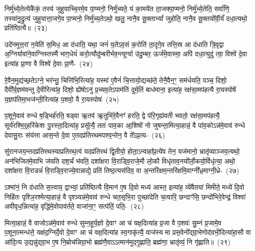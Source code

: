 निर्मु॑च्ये॒तेत्येकै॑कं॒ तस्य॑ जुहुयाच्चि॒रमे॒व पा॒प्मनो॒ निर्मु॑च्यते॒ यं का॒मये॑त ता॒जक्पा॒प्मनो॒ निर्मु॑च्ये॒तेति॒ सर्वा॑णि॒ तस्या॑नु॒द्रुत्य॑ जुहुयात्ता॒जगे॒व पा॒प्मनो॒ निर्मु॑च्य॒ते\-ऽथो॒ खलु॒ नानै॒व सू॒क्ता\-भ्यां᳚ जुहोति॒ नानै॒व सू॒क्तयो᳚र्वी॒र्यं॑ दधा॒त्यथो॒ प्रति॑ष्ठित्यै॥~(२३)\ip

{\anuvakamend[{दे॒वाः प्रा॑जाप॒त्यो वृ॒त्रश्चि॒रं पा॒प्मन॑श्चत्वारि॒ꣳ॒शच्च॑}]}

उदे॑नमुत्त॒रां न॒येति॑ स॒मिध॒ आ द॑धाति॒ यथा॒ जनं॑ य॒ते॑\-ऽव॒सं क॒रोति॑ ता॒दृगे॒व तत्ति॒स्र आ द॑धाति त्रि॒वृद्वा अ॒ग्निर्यावा॑ने॒वाग्निस्तस्मै॑ भाग॒\-धेयं॑ करो॒त्यौदु॑म्बरीर्भव॒न्त्यूर्ग्वा उ॑दु॒म्बर॒ ऊर्ज॑मे॒वास्मा॒ अपि॑ दधा॒त्युदु॑ त्वा॒ विश्वे॑ दे॒वा इत्या॑ह प्रा॒णा वै विश्वे॑ दे॒वाः प्रा॒णै-~(२४)\ip

रे॒वैन॒मुद्य॑च्छ॒ते\-ऽग्ने॒ भर॑न्तु॒ चित्ति॑भि॒रित्या॑ह॒ यस्मा॑ ए॒वैनं॑ चि॒त्तायो॒द्यच्छ॑ते॒ तेनै॒वैन॒ꣳ॒ सम॑र्धयति॒ पञ्च॒ दिशो॒ दैवी᳚र्य॒ज्ञम॑वन्तु दे॒वीरित्या॑ह॒ दिशो॒ ह्ये॑षो\-ऽनु॑ प्र॒च्यव॒ते\-ऽपाम॑तिं दुर्म॒तिं बाध॑माना॒ इत्या॑ह॒ रक्ष॑सा॒मप॑हत्यै रा॒यस्पोषे॑ य॒ज्ञप॑तिमा॒भज॑न्ती॒रित्या॑ह प॒शवो॒ वै रा॒यस्पोषः॑~(२५)\ip

प॒शूने॒वाव॑ रुन्धे ष॒ड्भिर्\mbox{}ह॑रति॒ षड्वा ऋ॒तव॑ ऋ॒तुभि॑रे॒वैनꣳ॑ हरति॒ द्वे प॑रि॒गृह्य॑वती भवतो॒ रक्ष॑सा॒मप॑हत्यै॒ सूर्य॑रश्मि॒र्॒\mbox{}हरि॑केशः पु॒रस्ता॒दित्या॑ह॒ प्रसू᳚त्यै॒ ततः॑ पाव॒का आ॒शिषो॑ नो जुषन्ता॒मित्या॒हान्नं॒ वै पा॑व॒को\-ऽन्न॑मे॒वाव॑ रुन्धे देवासु॒राः संय॑त्ता आस॒न्ते दे॒वा ए॒तदप्र॑तिरथमपश्य॒न्तेन॒ वै ते᳚\-ऽप्र॒त्य-~(२६)\ip

सु॑रानजय॒न्तदप्र॑तिरथस्याप्रतिरथ॒त्वं यदप्र॑तिरथं द्वि॒तीयो॒ होता॒\-ऽन्वाहा᳚प्र॒त्ये॑व तेन॒ यज॑मानो॒ भ्रातृ॑व्याञ्जय॒त्यथो॒ अन॑भिजितमे॒वाभि ज॑यति दश॒र्चं भ॑वति॒ दशा᳚क्षरा वि॒राड्वि॒राजे॒मौ लो॒कौ विधृ॑ताव॒नयो᳚र्लो॒कयो॒र्विधृ॑त्या॒ अथो॒ दशा᳚क्षरा वि॒राडन्नं॑ वि॒राड्वि॒राज्ये॒वान्नाद्ये॒ प्रति॑ तिष्ठ॒त्यस॑दिव॒ वा अ॒न्तरि॑क्षम॒न्तरि॑क्षमि॒वाग्नी᳚ध्र॒माग्नी॒ध्रे-~(२७)\ip

ऽश्मा॑नं॒ नि द॑धाति स॒त्त्वाय॒ द्वाभ्यां॒ प्रति॑ष्ठित्यै वि॒मान॑ ए॒ष दि॒वो मध्य॑ आस्त॒ इत्या॑ह॒ व्ये॑वैतया॑ मिमीते॒ मध्ये॑ दि॒वो निहि॑तः पृश्ञि॒रश्मेत्या॒हान्नं॒ वै पृश्ञ्यन्न॑मे॒वाव॑ रुन्धे चत॒सृभि॒रा पुच्छा॑देति च॒त्वारि॒ छन्दाꣳ॑सि॒ छन्दो॑भिरे॒वेन्द्रं॒ विश्वा॑ अवीवृध॒न्नित्या॑ह॒ वृद्धि॑मे॒वोपाव॑र्तते॒ वाजा॑ना॒ꣳ॒ सत्प॑तिं॒ पति॒-~(२८)\ip

मित्या॒हान्नं॒ वै वाजो\-ऽन्न॑मे॒वाव॑ रुन्धे सुम्न॒हूर्य॒ज्ञो दे॒वाꣳ आ च॑ वक्ष॒दित्या॑ह प्र॒जा वै प॒शवः॑ सु॒म्नं प्र॒जामे॒व प॒शूना॒त्मन्ध॑त्ते॒ यक्ष॑द॒ग्निर्दे॒वो दे॒वाꣳ आ च॑ वक्ष॒दित्या॑ह स्व॒गाकृ॑त्यै॒ वाज॑स्य मा प्रस॒वेनो᳚द्ग्रा॒भेणोद॑ग्रभी॒दित्या॑हा॒सौ वा आ॑दि॒त्य उ॒द्यन्नु॑द्ग्रा॒भ ए॒ष नि॒म्रोच॑न्निग्रा॒भो ब्रह्म॑णै॒वा\-ऽऽत्मान॑मुद्गृ॒ह्णाति॒ ब्रह्म॑णा॒ भ्रातृ॑व्यं॒ नि गृ॑ह्णाति॥~(२९)\ip

